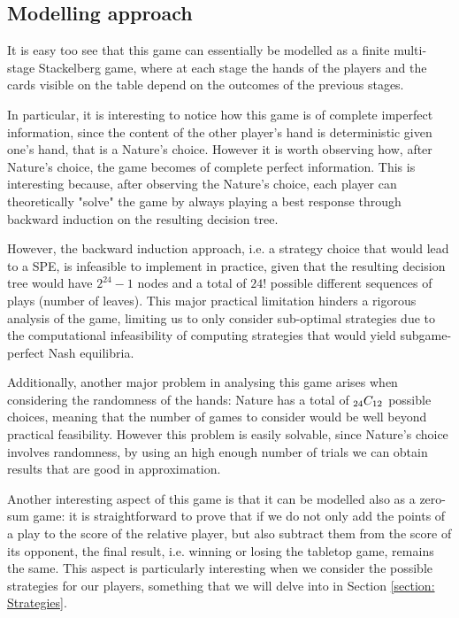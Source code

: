 \subsection{Modelling approach}

It is easy too see that this game can essentially be modelled as a finite multi-stage Stackelberg game, where at each stage the hands of the players and the cards visible on the table depend on the outcomes of the previous stages.

In particular, it is interesting to notice how this game is of complete imperfect information, since the content of the other player's hand is deterministic given one's hand, that is a Nature's choice. 
However it is worth observing how, after Nature's choice, the game becomes of complete perfect information.
This is interesting because, after observing the Nature's choice, each player can theoretically "solve" the game by always playing a best response through backward induction on the resulting decision tree.

However, the backward induction approach, i.e. a strategy choice that would lead to a SPE, is infeasible to implement in practice, given that the resulting decision tree would have $2^24 - 1$ nodes and a total of $24!$ possible different sequences of plays (number of leaves).
This major practical limitation hinders a rigorous analysis of the game, limiting us to only consider sub-optimal strategies due to the computational infeasibility of computing strategies that would yield subgame-perfect Nash equilibria.

Additionally, another major problem in analysing this game arises when considering the randomness of the hands: Nature has a total of ${}_{24}C_{12}$ possible choices, meaning that the number of games to consider would be well beyond practical feasibility.
However this problem is easily solvable, since Nature's choice involves randomness, by using an high enough number of trials we can obtain results that are good in approximation.

Another interesting aspect of this game is that it can be modelled also as a zero-sum game: it is straightforward to prove that if we do not only add the points of a play to the score of the relative player, but also subtract them from the score of its opponent, the final result, i.e. winning or losing the tabletop game, remains the same.
This aspect is particularly interesting when we consider the possible strategies for our players, something that we will delve into in Section \ref{section: Strategies}.
